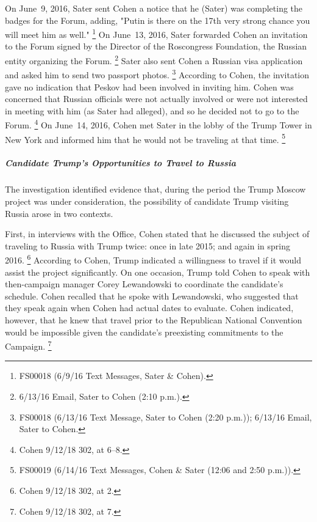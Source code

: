 On June~9, 2016, Sater sent Cohen a notice that he (Sater) was completing the badges for the Forum, adding, "Putin is there on the 17th very strong chance you will meet him as well."%
\footnote{FS00018 (6/9/16 Text Messages, Sater \& Cohen).}
On June~13, 2016, Sater forwarded Cohen an invitation to the Forum signed by the Director of the Roscongress Foundation, the Russian entity organizing the Forum.%
\footnote{6/13/16 Email, Sater to Cohen (2:10 p.m.).}
Sater also sent Cohen a Russian visa application and asked him to send two passport photos.%
\footnote{FS00018 (6/13/16 Text Message, Sater to Cohen (2:20 p.m.));
6/13/16 Email, Sater to Cohen.}
According to Cohen, the invitation gave no indication that Peskov had been involved in inviting him.
Cohen was concerned that Russian officials were not actually involved or were not interested in meeting with him (as Sater had alleged), and so he decided not to go to the Forum.%
\footnote{Cohen 9/12/18 302, at 6--8.}
On June~14, 2016, Cohen met Sater in the lobby of the Trump Tower in New York and informed him that he would not be traveling at that time.%
\footnote{FS00019 (6/14/16 Text Messages, Cohen \& Sater (12:06 and 2:50 p.m.)).}

\subparagraph{Candidate Trump's Opportunities to Travel to Russia}

The investigation identified evidence that, during the period the Trump Moscow project was under consideration, the possibility of candidate Trump visiting Russia arose in two contexts.

First, in interviews with the Office, Cohen stated that he discussed the subject of traveling to Russia with Trump twice: once in late 2015; and again in spring 2016.%
\footnote{Cohen 9/12/18 302, at 2.}
According to Cohen, Trump indicated a willingness to travel if it would assist the project significantly.
On one occasion, Trump told Cohen to speak with then-campaign manager Corey Lewandowski to coordinate the candidate's schedule.
Cohen recalled that he spoke with Lewandowski, who suggested that they speak again when Cohen had actual dates to evaluate.
Cohen indicated, however, that he knew that travel prior to the Republican National Convention would be impossible given the candidate's preexisting commitments to the Campaign.%
\footnote{Cohen 9/12/18 302, at 7.}

